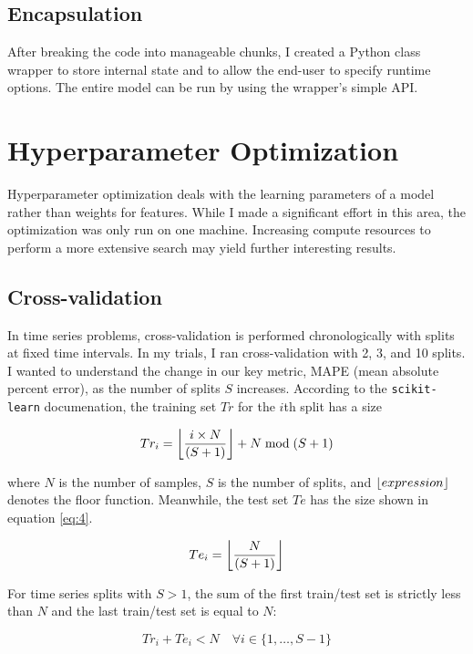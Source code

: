 \documentclass[11pt, oneside, authoryear]{report}
\DeclarePairedDelimiter{\floor}{\lfloor}{\rfloor}
\begin{document}
\subsection{Encapsulation}
After breaking the code into manageable chunks, I created a Python class wrapper to store internal state and to allow the end-user to specify runtime options. The entire model can be run by using the wrapper's simple API.

\section{Hyperparameter Optimization}
Hyperparameter optimization deals with the learning parameters of a model rather than weights for features. While I made a significant effort in this area, the optimization was only run on one machine. Increasing compute resources to perform a more extensive search may yield further interesting results.

\subsection{Cross-validation}
\label{cross_validation}
In time series problems, cross-validation is performed chronologically with splits at fixed time intervals. In my trials, I ran cross-validation with 2, 3, and 10 splits. I wanted to understand the change in our key metric, MAPE (mean absolute percent error), as the number of splits $S$ increases. According to the \texttt{scikit-learn} documenation, the training set $Tr$ for the $i$th split has a size

\begin{equation}
  \label{eq:3}
  Tr_{i} = \floor*{\frac{i \times N}{(S + 1)}} + N \bmod (S + 1)
\end{equation}

where $N$ is the number of samples, $S$ is the number of splits, and $\floor{expression}$ denotes the floor function. Meanwhile, the test set $Te$ has the size shown in equation \ref{eq:4}.

\begin{equation}
  \label{eq:4}
  Te_{i} = \floor*{\frac{N}{(S + 1)}}
\end{equation}

For time series splits with $S>1$, the sum of the first train/test set is strictly less than $N$ and the last train/test set is equal to $N$:

\begin{equation}
  \label{eq:5}
  Tr_{i} + Te_{i} < N \quad \forall i \in \{1, \dots, S-1\}
\end{equation}
\end{document}
